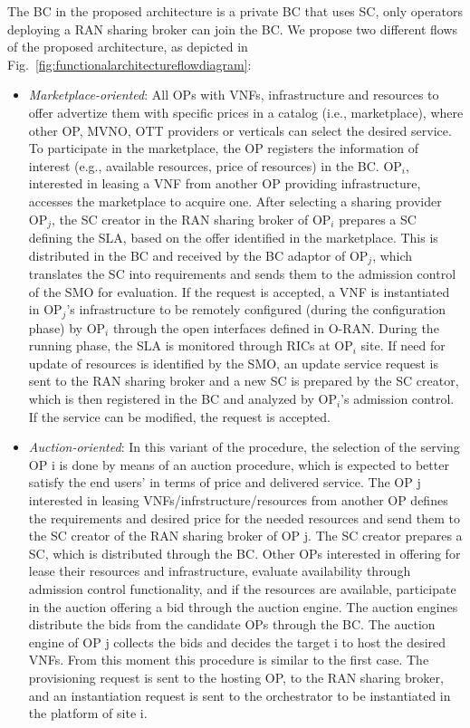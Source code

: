 \documentclass[journal]{IEEEtran}
\begin{document}
The BC in the proposed architecture is a private BC that uses SC, only operators deploying a RAN sharing broker can join the BC. We propose two different flows of the proposed architecture, as depicted in Fig.~\ref{fig:functionalarchitectureflowdiagram}:
\begin{itemize}
    \item \textit{Marketplace-oriented}: All OPs with VNFs, infrastructure and resources to offer advertize them with specific prices in a catalog (i.e., marketplace), where other OP, MVNO, OTT providers or verticals can select the desired service. To participate in the marketplace, the OP registers the information of interest (e.g., available resources, price of resources) in the BC. OP$_i$, interested in leasing a VNF from another OP providing infrastructure, accesses the marketplace to acquire one. After selecting a sharing provider OP$_j$, the SC creator in the RAN sharing broker of OP$_i$ prepares a SC defining the SLA, based on the offer identified in the marketplace. This is distributed in the BC and received by the BC adaptor of OP$_j$, which translates the SC into requirements and sends them to the admission control of the SMO for evaluation. If the request is accepted, a VNF is instantiated in OP$_j$'s infrastructure to be remotely configured (during the configuration phase) by OP$_i$ through the open interfaces defined in O-RAN. During the running phase, the SLA is monitored through RICs at OP$_i$ site. If need for update of resources is identified by the SMO, an update service request is sent to the RAN sharing broker and a new SC is prepared by the SC creator, which is then registered in the BC and analyzed by OP$_i$'s admission control. If the service can be modified, the request is accepted.
    \item \textit{Auction-oriented}: In this variant of the procedure, the selection of the serving OP i is done by means of an auction procedure, which is expected to better satisfy the end users' in terms of price and delivered service. The OP j interested in leasing VNFs/infrstructure/resources from another OP defines the requirements and desired price for the needed resources and send them to the SC creator of the RAN sharing broker of OP j. The SC creator prepares a SC, which is distributed through the BC. Other OPs interested in offering for lease their resources and infrastructure, evaluate availability through admission control functionality, and if the resources are available, participate in the auction offering a bid through the auction engine. The auction engines distribute the bids from the candidate OPs through the BC. The auction engine of OP j collects the bids and decides the target i to host the desired VNFs. From this moment this procedure is similar to the first case. The provisioning request is sent to the hosting OP, to the RAN sharing broker, and an instantiation request is sent to the orchestrator to be instantiated in the platform of site i. 
\end{itemize}
\end{document}
